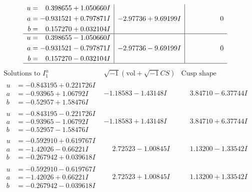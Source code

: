 \documentclass[1p]{elsarticle_modified}
\theoremstyle{definition}
\newcommand{\I}{\sqrt{-1}}
\begin{document}
$$\begin{array}{c|c|c}
\begin{aligned}
u &= \phantom{-}0.398655 + 1.050660 I \\
a &= -0.931521 + 0.797871 I \\
b &= \phantom{-}0.157270 + 0.032104 I\end{aligned}
 & -2.97736 + 9.69199 I & \phantom{-0.000000 } 0 \\ \hline\begin{aligned}
u &= \phantom{-}0.398655 - 1.050660 I \\
a &= -0.931521 - 0.797871 I \\
b &= \phantom{-}0.157270 - 0.032104 I\end{aligned}
 & -2.97736 - 9.69199 I & \phantom{-0.000000 } 0\\
 \hline 
 \end{array}$$\newpage$$\begin{array}{c|c|c}  
\text{Solutions to }I^u_{1}& \I (\text{vol} + \sqrt{-1}CS) & \text{Cusp shape}\\
 \hline 
\begin{aligned}
u &= -0.843195 + 0.221726 I \\
a &= -0.93965 + 1.06792 I \\
b &= -0.52957 + 1.58476 I\end{aligned}
 & -1.18583 - 1.43148 I & \phantom{-}3.84710 - 6.37744 I \\ \hline\begin{aligned}
u &= -0.843195 - 0.221726 I \\
a &= -0.93965 - 1.06792 I \\
b &= -0.52957 - 1.58476 I\end{aligned}
 & -1.18583 + 1.43148 I & \phantom{-}3.84710 + 6.37744 I \\ \hline\begin{aligned}
u &= -0.592910 + 0.619767 I \\
a &= -1.42026 - 0.66221 I \\
b &= -0.267942 + 0.039618 I\end{aligned}
 & \phantom{-}2.72523 - 1.00845 I & \phantom{-}1.13200 - 1.33542 I \\ \hline\begin{aligned}
u &= -0.592910 - 0.619767 I \\
a &= -1.42026 + 0.66221 I \\
b &= -0.267942 - 0.039618 I\end{aligned}
 & \phantom{-}2.72523 + 1.00845 I & \phantom{-}1.13200 + 1.33542 I \\ \hline\begin{aligned}

\end{aligned}
\end{array}$$
\end{document}
